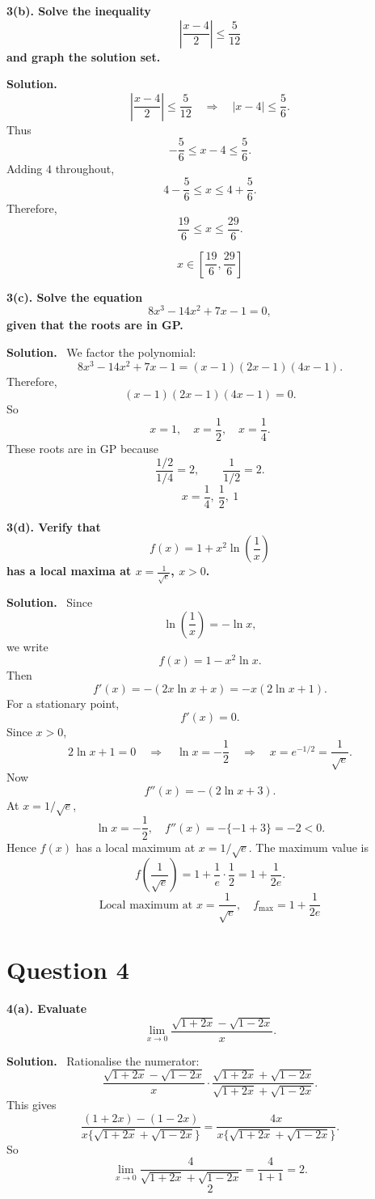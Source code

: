 \documentclass[11pt,a4paper]{article}
\newcommand{\question}[1]{\vspace{4pt}\begin{tcolorbox}[colback=softblue,colframe=headblue,boxrule=0.6pt,arc=2pt,left=5pt,right=5pt,top=4pt,bottom=4pt]\textbf{#1}\end{tcolorbox}}
\newcommand{\answer}{\textbf{Solution.}~}
\newcommand{\finalans}[1]{\[\boxed{#1}\]}
\begin{document}
\question{3(b). Solve the inequality
\[
\left|\frac{x-4}{2}\right|\leq\frac{5}{12}
\]
and graph the solution set.}
\answer
\[
\left|\frac{x-4}{2}\right|\leq\frac{5}{12}
\quad\Rightarrow\quad
|x-4|\leq\frac{5}{6}.
\]
Thus
\[
-\frac56\leq x-4\leq\frac56.
\]
Adding $4$ throughout,
\[
4-\frac56\leq x\leq4+\frac56.
\]
Therefore,
\[
\frac{19}{6}\leq x\leq\frac{29}{6}.
\]

\begin{center}
\end{center}

\finalans{x\in\left[\frac{19}{6},\frac{29}{6}\right]}

\question{3(c). Solve the equation
\[
8x^3-14x^2+7x-1=0,
\]
given that the roots are in GP.}
\answer
We factor the polynomial:
\[
8x^3-14x^2+7x-1
=(x-1)(2x-1)(4x-1).
\]
Therefore,
\[
(x-1)(2x-1)(4x-1)=0.
\]
So
\[
x=1,\quad x=\frac12,\quad x=\frac14.
\]
These roots are in GP because
\[
\frac{1/2}{1/4}=2,
\qquad \frac{1}{1/2}=2.
\]
\finalans{x=\frac14,\ \frac12,\ 1}

\question{3(d). Verify that
\[
f(x)=1+x^2\ln\left(\frac1x\right)
\]
has a local maxima at $x=\frac1{\sqrt e}$, $x>0$.}
\answer
Since
\[
\ln\left(\frac1x\right)=-\ln x,
\]
we write
\[
f(x)=1-x^2\ln x.
\]
Then
\[
f'(x)=-(2x\ln x+x)=-x(2\ln x+1).
\]
For a stationary point,
\[
f'(x)=0.
\]
Since $x>0$,
\[
2\ln x+1=0
\quad\Rightarrow\quad
\ln x=-\frac12
\quad\Rightarrow\quad
x=e^{-1/2}=\frac1{\sqrt e}.
\]
Now
\[
f''(x)=-(2\ln x+3).
\]
At $x=1/\sqrt e$,
\[
\ln x=-\frac12,
\quad
f''(x)=-\{-1+3\}=-2<0.
\]
Hence $f(x)$ has a local maximum at $x=1/\sqrt e$.
The maximum value is
\[
f\left(\frac1{\sqrt e}\right)=1+\frac1e\cdot\frac12=1+\frac1{2e}.
\]
\finalans{\text{Local maximum at }x=\frac1{\sqrt e},\quad f_{\max}=1+\frac1{2e}}

\section*{Question 4}

\question{4(a). Evaluate
\[
\lim_{x\to0}\frac{\sqrt{1+2x}-\sqrt{1-2x}}{x}.
\]}
\answer
Rationalise the numerator:
\[
\frac{\sqrt{1+2x}-\sqrt{1-2x}}{x}
\cdot
\frac{\sqrt{1+2x}+\sqrt{1-2x}}{\sqrt{1+2x}+\sqrt{1-2x}}.
\]
This gives
\[
\frac{(1+2x)-(1-2x)}{x\{\sqrt{1+2x}+\sqrt{1-2x}\}}
=
\frac{4x}{x\{\sqrt{1+2x}+\sqrt{1-2x}\}}.
\]
So
\[
\lim_{x\to0}\frac{4}{\sqrt{1+2x}+\sqrt{1-2x}}
=\frac{4}{1+1}=2.
\]
\finalans{2}
\end{document}

